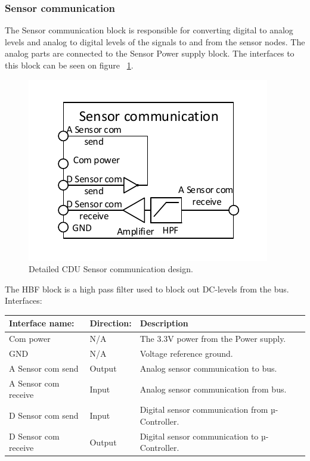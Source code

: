 \subsubsection{Sensor communication}
The Sensor communication block is responsible for converting digital to analog levels and analog to digital levels of the signals to and from the sensor nodes. The analog parts are connected to the Sensor Power supply block.
The interfaces to this block can be seen on figure ~\ref{fig:CDUSC}.\\
\begin{figure}[H]
	\centering
	\includegraphics[scale=1]{billeder/CDUSC}
	\caption{Detailed CDU Sensor communication design.}
	\label{fig:CDUSC}
\end{figure}
The HBF block is a high pass filter used to block out DC-levels from the bus.\\
Interfaces:
\begin{table}[H]
	\centering
	\begin{tabular}{|p{3cm} |p{3cm}| p{8cm}| }
		\hline
		Interface name: & Direction: 	& Description \\ \hline
		Com power	  &N/A & The 3.3V power from the Power supply. \\ \hline
		GND				&N/A & Voltage reference ground. \\\hline 
		A Sensor com send	&Output & Analog sensor communication to bus. \\\hline 
		A Sensor com receive &Input	& Analog sensor communication from bus. \\\hline
		D Sensor com send & Input	& Digital sensor communication from µ-Controller. \\\hline 
		D Sensor com receive &Output	& Digital sensor communication to µ-Controller. \\\hline
	\end{tabular}
\end{table}


